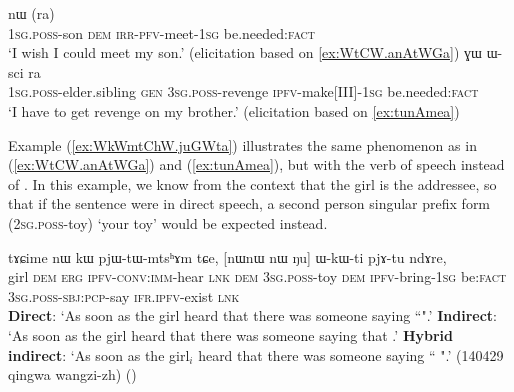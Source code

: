 \begin{exe}
\ex
\begin{xlist}
\ex \label{ex:WtCW.anAtWGa2}
\gll {} nɯ  (ra) \\
 \textsc{1sg}.\textsc{poss}-son \textsc{dem} \textsc{irr}-\textsc{pfv}-meet-\textsc{1sg} be.needed:\textsc{fact}\\
\glt `I wish I could meet my son.' (elicitation based on \ref{ex:WtCW.anAtWGa})
\ex \label{ex:tunAmea2}
\gll {} ɣɯ ɯ-sci  ra \\
 {\textsc{1sg}.\textsc{poss}-elder.sibling}  \textsc{gen} \textsc{3sg}.\textsc{poss}-revenge {\textsc{ipfv}-make[III]-\textsc{1sg}} be.needed:\textsc{fact}  \\
\glt `I have to get revenge on my brother.' (elicitation based on \ref{ex:tunAmea})
\end{xlist}
  \end{exe}
    
Example (\ref{ex:WkWmtChW.juGWta}) illustrates the same phenomenon as in (\ref{ex:WtCW.anAtWGa}) and (\ref{ex:tunAmea}), but with the verb of speech  instead of . In this example, we know from the context that the girl is the addressee, so that if the sentence were in direct speech, a second person singular prefix form  (\textsc{2sg}.\textsc{poss}-toy) `your toy' would be expected instead.
 
\begin{exe}
\ex \label{ex:WkWmtChW.juGWta}
\gll  tɤɕime nɯ kɯ pjɯ-tɯ-mtsʰɤm tɕe, [nɯnɯ  nɯ  	 ŋu] ɯ-kɯ-ti pjɤ-tu ndɤre, \\
girl \textsc{dem} \textsc{erg} \textsc{ipfv}-\textsc{conv}:\textsc{imm}-hear \textsc{lnk} \textsc{dem}  \textsc{3sg}.\textsc{poss}-toy  \textsc{dem}  \textsc{ipfv}-bring-\textsc{1sg}  be:\textsc{fact} \textsc{3sg}.\textsc{poss}-\textsc{sbj}:\textsc{pcp}-say \textsc{ifr}.\textsc{ipfv}-exist \textsc{lnk} \\
\glt   \textbf{Direct}: `As soon as the girl heard that there was someone saying ``".'
\glt   \textbf{Indirect}:  `As soon as the girl heard that there was someone saying that .'
\glt   \textbf{Hybrid indirect}: `As soon as the girl$_i$ heard that there was someone saying `` ".' (140429 qingwa wangzi-zh)
()
\end{exe}


